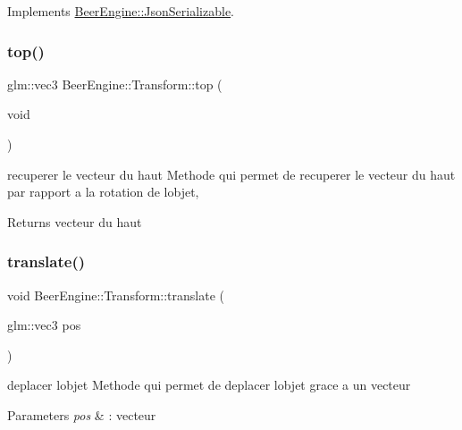 Implements \mbox{\hyperlink{class_beer_engine_1_1_json_serializable_a17689cbd8fe282c570bd026cc1be5b3b}{Beer\+Engine\+::\+Json\+Serializable}}.

\mbox{\label{class_beer_engine_1_1_transform_a5fbee07c1e2151d649d2eb82ec854ac0}} 
\subsubsection{\texorpdfstring{top()}{top()}}
{\footnotesize\ttfamily glm\+::vec3 Beer\+Engine\+::\+Transform\+::top (\begin{DoxyParamCaption}\item[{void}]{ }\end{DoxyParamCaption})}



recuperer le vecteur du haut Methode qui permet de recuperer le vecteur du haut par rapport a la rotation de l\textquotesingle{}objet, 

\begin{DoxyReturn}{Returns}
vecteur du haut 
\end{DoxyReturn}
\mbox{\label{class_beer_engine_1_1_transform_aaca147072f231beb5a0fe8b32f23b85d}} 
\subsubsection{\texorpdfstring{translate()}{translate()}\hspace{0.1cm}{\footnotesize\ttfamily [1/2]}}
{\footnotesize\ttfamily void Beer\+Engine\+::\+Transform\+::translate (\begin{DoxyParamCaption}\item[{glm\+::vec3}]{pos }\end{DoxyParamCaption})}



deplacer l\textquotesingle{}objet Methode qui permet de deplacer l\textquotesingle{}objet grace a un vecteur 


\begin{DoxyParams}{Parameters}
{\em pos} & \+: vecteur \\
\hline
\end{DoxyParams}
\mbox{\label{class_beer_engine_1_1_transform_a5f07e949bf65200de14b97f8c850bd43}} 
